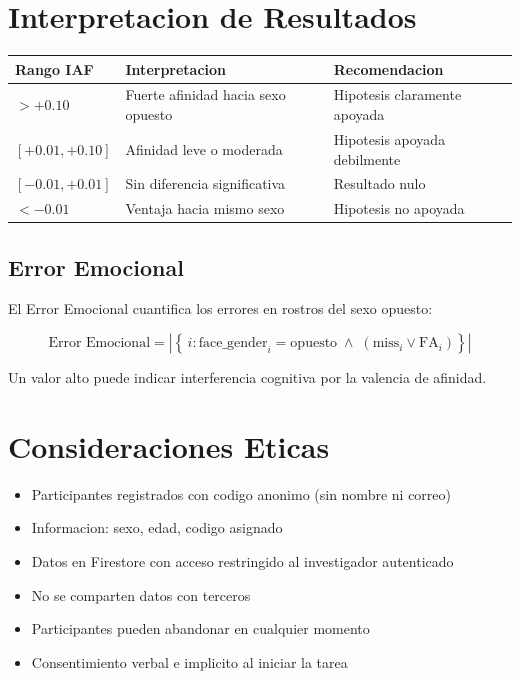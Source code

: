 \documentclass[12pt,a4paper]{article}
\begin{document}
\section{Interpretacion de Resultados}

\begin{longtable}{>{\centering}p{2.5cm} p{5cm} p{5cm}}
\toprule
\textbf{Rango IAF} & \textbf{Interpretacion} & \textbf{Recomendacion} \\
\midrule
$> +0.10$            & Fuerte afinidad hacia sexo opuesto & Hipotesis claramente apoyada \\
$[+0.01, +0.10]$     & Afinidad leve o moderada           & Hipotesis apoyada debilmente \\
$[-0.01, +0.01]$     & Sin diferencia significativa        & Resultado nulo \\
$< -0.01$            & Ventaja hacia mismo sexo            & Hipotesis no apoyada \\
\bottomrule
\end{longtable}

\subsection{Error Emocional}

El Error Emocional cuantifica los errores en rostros del sexo opuesto:

\begin{equation}
  \text{Error Emocional} =
  \left|\left\{\,i : \text{face\_gender}_i = \text{opuesto}
  \;\land\; (\text{miss}_i \lor \text{FA}_i)\right\}\right|
\end{equation}

Un valor alto puede indicar interferencia cognitiva por la valencia de afinidad.

\section{Consideraciones Eticas}

\begin{tcolorbox}[infobox, title={Protocolo de privacidad}]
\begin{itemize}[leftmargin=1em]
  \item Participantes registrados con codigo anonimo (sin nombre ni correo)
  \item Informacion: sexo, edad, codigo asignado
  \item Datos en Firestore con acceso restringido al investigador autenticado
  \item No se comparten datos con terceros
  \item Participantes pueden abandonar en cualquier momento
  \item Consentimiento verbal e implicito al iniciar la tarea
\end{itemize}
\end{tcolorbox}
\end{document}
